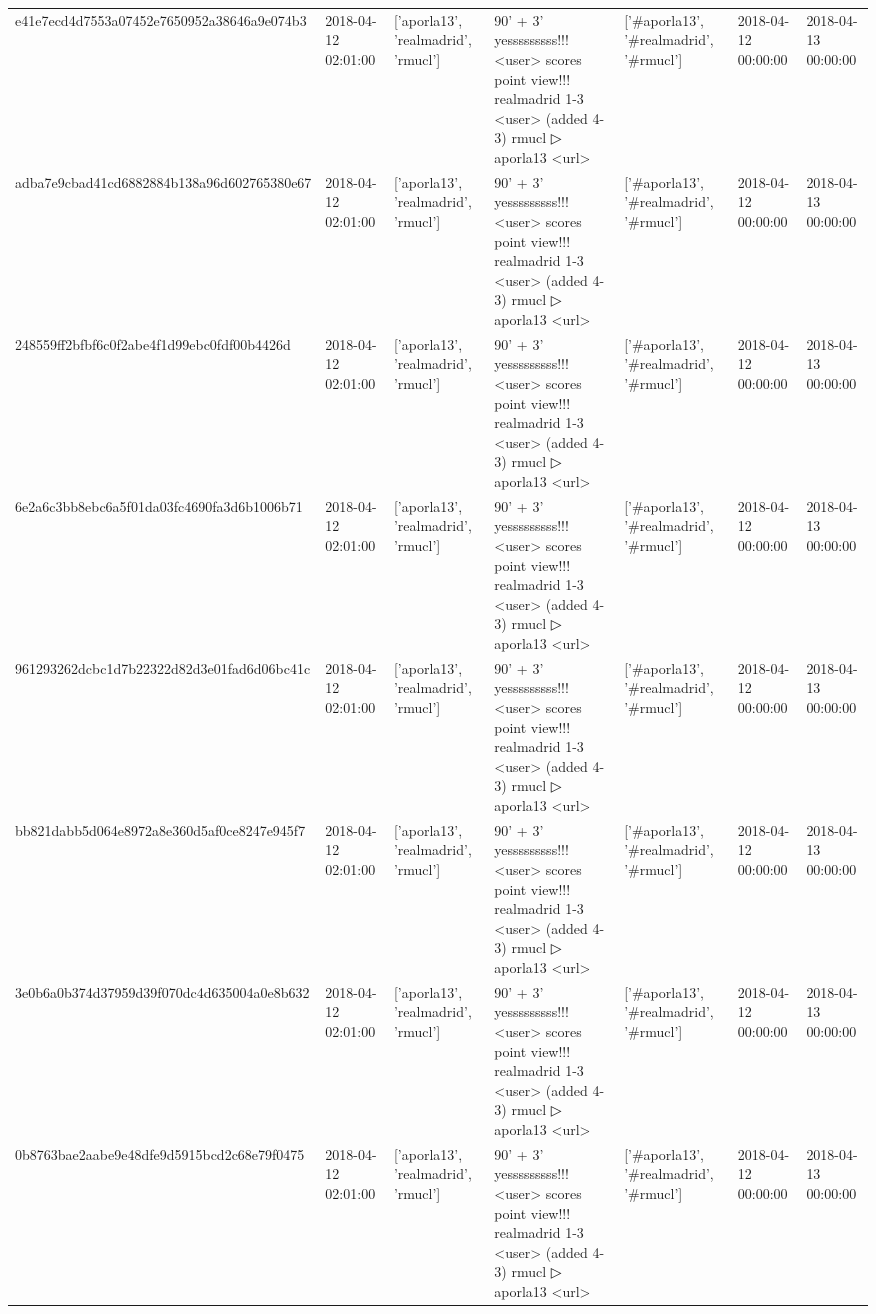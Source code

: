 \begin{tabular}{lllllll}
e41e7ecd4d7553a07452e7650952a38646a9e074b3 & 2018-04-12 02:01:00 & ['aporla13', 'realmadrid', 'rmucl'] & 90' + 3' yesssssssss!!! <user> scores point view!!! realmadrid 1-3 <user> (added 4-3) rmucl ▷ aporla13 <url> & ['#aporla13', '#realmadrid', '#rmucl'] & 2018-04-12 00:00:00 & 2018-04-13 00:00:00 \\
adba7e9cbad41cd6882884b138a96d602765380e67 & 2018-04-12 02:01:00 & ['aporla13', 'realmadrid', 'rmucl'] & 90' + 3' yesssssssss!!! <user> scores point view!!! realmadrid 1-3 <user> (added 4-3) rmucl ▷ aporla13 <url> & ['#aporla13', '#realmadrid', '#rmucl'] & 2018-04-12 00:00:00 & 2018-04-13 00:00:00 \\
248559ff2bfbf6c0f2abe4f1d99ebc0fdf00b4426d & 2018-04-12 02:01:00 & ['aporla13', 'realmadrid', 'rmucl'] & 90' + 3' yesssssssss!!! <user> scores point view!!! realmadrid 1-3 <user> (added 4-3) rmucl ▷ aporla13 <url> & ['#aporla13', '#realmadrid', '#rmucl'] & 2018-04-12 00:00:00 & 2018-04-13 00:00:00 \\
6e2a6c3bb8ebc6a5f01da03fc4690fa3d6b1006b71 & 2018-04-12 02:01:00 & ['aporla13', 'realmadrid', 'rmucl'] & 90' + 3' yesssssssss!!! <user> scores point view!!! realmadrid 1-3 <user> (added 4-3) rmucl ▷ aporla13 <url> & ['#aporla13', '#realmadrid', '#rmucl'] & 2018-04-12 00:00:00 & 2018-04-13 00:00:00 \\
961293262dcbc1d7b22322d82d3e01fad6d06bc41c & 2018-04-12 02:01:00 & ['aporla13', 'realmadrid', 'rmucl'] & 90' + 3' yesssssssss!!! <user> scores point view!!! realmadrid 1-3 <user> (added 4-3) rmucl ▷ aporla13 <url> & ['#aporla13', '#realmadrid', '#rmucl'] & 2018-04-12 00:00:00 & 2018-04-13 00:00:00 \\
bb821dabb5d064e8972a8e360d5af0ce8247e945f7 & 2018-04-12 02:01:00 & ['aporla13', 'realmadrid', 'rmucl'] & 90' + 3' yesssssssss!!! <user> scores point view!!! realmadrid 1-3 <user> (added 4-3) rmucl ▷ aporla13 <url> & ['#aporla13', '#realmadrid', '#rmucl'] & 2018-04-12 00:00:00 & 2018-04-13 00:00:00 \\
3e0b6a0b374d37959d39f070dc4d635004a0e8b632 & 2018-04-12 02:01:00 & ['aporla13', 'realmadrid', 'rmucl'] & 90' + 3' yesssssssss!!! <user> scores point view!!! realmadrid 1-3 <user> (added 4-3) rmucl ▷ aporla13 <url> & ['#aporla13', '#realmadrid', '#rmucl'] & 2018-04-12 00:00:00 & 2018-04-13 00:00:00 \\
0b8763bae2aabe9e48dfe9d5915bcd2c68e79f0475 & 2018-04-12 02:01:00 & ['aporla13', 'realmadrid', 'rmucl'] & 90' + 3' yesssssssss!!! <user> scores point view!!! realmadrid 1-3 <user> (added 4-3) rmucl ▷ aporla13 <url> & ['#aporla13', '#realmadrid', '#rmucl'] & 2018-04-12 00:00:00 & 2018-04-13 00:00:00 \\

\end{tabular}

